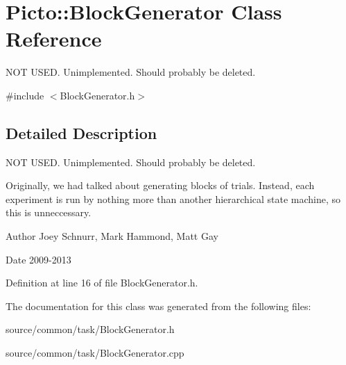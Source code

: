 \hypertarget{class_picto_1_1_block_generator}{\section{Picto\-:\-:Block\-Generator Class Reference}
\label{class_picto_1_1_block_generator}
}


N\-O\-T U\-S\-E\-D. Unimplemented. Should probably be deleted.  




{\ttfamily \#include $<$Block\-Generator.\-h$>$}



\subsection{Detailed Description}
N\-O\-T U\-S\-E\-D. Unimplemented. Should probably be deleted. 

Originally, we had talked about generating blocks of trials. Instead, each experiment is run by nothing more than another hierarchical state machine, so this is unneccessary. \begin{DoxyAuthor}{Author}
Joey Schnurr, Mark Hammond, Matt Gay 
\end{DoxyAuthor}
\begin{DoxyDate}{Date}
2009-\/2013 
\end{DoxyDate}


Definition at line 16 of file Block\-Generator.\-h.



The documentation for this class was generated from the following files\-:\begin{DoxyCompactItemize}
\item 
source/common/task/Block\-Generator.\-h\item 
source/common/task/Block\-Generator.\-cpp\end{DoxyCompactItemize}
